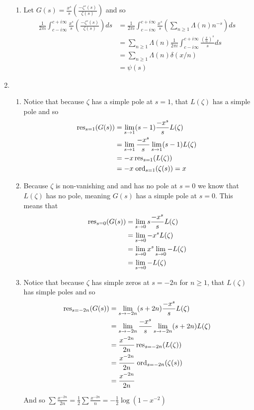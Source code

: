 \documentclass[12pt]{amsart}
\newcommand{\ps}[1]{\left( #1 \right)}
\begin{document}
\begin{enumerate}
\begin{enumerate}
    \item Let $G(s)=\frac{x^s}{s}\ps{\frac{-\zeta'(s)}{\zeta(s)}}$ and so 
    \begin{align*}
        \frac{1}{2\pi i}\int_{c-i\infty}^{c+i\infty}\frac{x^s}{s}\ps{\frac{-\zeta'(s)}{\zeta(s)}}ds&=\frac{1}{2\pi i}\int_{c-i\infty}^{c+i\infty}\frac{x^s}{s}\ps{\sum_{n\geq 1}\Lambda(n)n^{-s}}ds\\
        &=\sum_{n\geq 1}\Lambda(n)\frac{1}{2\pi i}\int_{c-i\infty}^{c+i\infty}\frac{\ps{\frac{x}{n}}^s}{s}ds\\
        &=\sum_{n\geq 1}\Lambda(n)\delta(x/n)\\
        &=\psi(s)
    \end{align*}
\end{enumerate}

\item
\begin{enumerate}
    \item Notice that because $\zeta$ has a simple pole at $s=1$, that $L(\zeta)$ has a simple pole and so 
    \begin{align*}
        \operatorname{\mathrm{res}}_{s=1}(G(s))&=\lim_{s\rightarrow 1}(s-1)\frac{-x^s}{s}L(\zeta)\\
        &=\lim_{s\rightarrow 1}\frac{-x^s}{s}\lim_{s\rightarrow 1}(s-1)L(\zeta)\\
        &=-x\operatorname{\mathrm{res}}_{s=1}(L(\zeta))\\
        &=-x\;\text{ord}_{s=1}(\zeta(s))=x
    \end{align*}
    \item Because $\zeta$ is non-vanishing and and has no pole at $s=0$ we know that $L(\zeta)$ has no pole, meaning $G(s)$ has a simple pole at $s=0$. This means that 
    \begin{align*}
        \operatorname{\mathrm{res}}_{s=0}(G(s))&=\lim_{s\rightarrow 0}s\frac{-x^s}{s}L(\zeta)\\
        &=\lim_{s\rightarrow 0}-x^sL(\zeta)\\
        &=\lim_{s\rightarrow 0}x^s\lim_{s\rightarrow 0}-L(\zeta)\\
        &=\lim_{s\rightarrow 0}-L(\zeta)
    \end{align*}
    \item Notice that because $\zeta$ has simple zeros at $s=-2n$ for $n\geq 1$, that $L(\zeta)$ has simple poles and so 
    \begin{align*}
        \operatorname{\mathrm{res}}_{s=-2n}(G(s))&=\lim_{s\rightarrow -2n}(s+2n)\frac{-x^s}{s}L(\zeta)\\
        &=\lim_{s\rightarrow -2n}\frac{-x^s}{s}\lim_{s\rightarrow -2n}(s+2n)L(\zeta)\\
        &=\frac{x^{-2n}}{2n}\operatorname{\mathrm{res}}_{s=-2n}(L(\zeta))\\
        &=\frac{x^{-2n}}{2n}\;\text{ord}_{s=-2n}(\zeta(s))\\
        &=\frac{x^{-2n}}{2n}
    \end{align*}

    And so $\sum \frac{x^{-2n}}{2n}=\frac{1}{2}\sum \frac{x^{-2n}}{n}=-\frac{1}{2}\log(1-x^{-2})$
\end{enumerate}
\end{enumerate}
\end{document}
